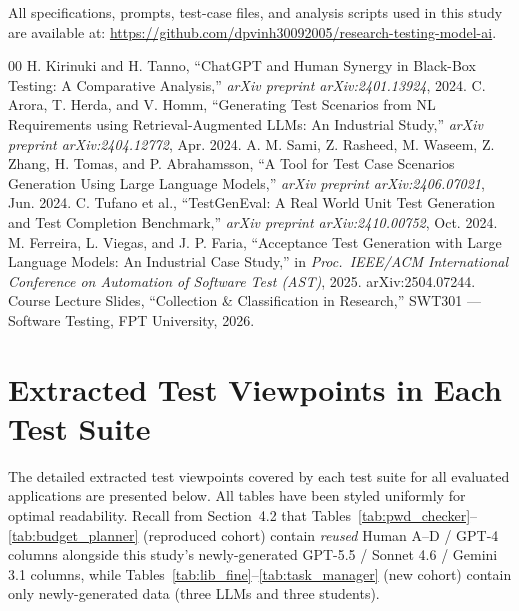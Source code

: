 \documentclass[12pt,a4paper]{article}
\begin{document}
All specifications, prompts, test-case files, and analysis scripts used in this study are available at: \url{https://github.com/dpvinh30092005/research-testing-model-ai}.

\clearpage
\begin{thebibliography}{00}
 H. Kirinuki and H. Tanno, ``ChatGPT and Human Synergy in Black-Box Testing: A Comparative Analysis,'' \textit{arXiv preprint arXiv:2401.13924}, 2024.
 C. Arora, T. Herda, and V. Homm, ``Generating Test Scenarios from NL Requirements using Retrieval-Augmented LLMs: An Industrial Study,'' \textit{arXiv preprint arXiv:2404.12772}, Apr. 2024.
 A. M. Sami, Z. Rasheed, M. Waseem, Z. Zhang, H. Tomas, and P. Abrahamsson, ``A Tool for Test Case Scenarios Generation Using Large Language Models,'' \textit{arXiv preprint arXiv:2406.07021}, Jun. 2024.
 C. Tufano et al., ``TestGenEval: A Real World Unit Test Generation and Test Completion Benchmark,'' \textit{arXiv preprint arXiv:2410.00752}, Oct. 2024.
 M. Ferreira, L. Viegas, and J. P. Faria, ``Acceptance Test Generation with Large Language Models: An Industrial Case Study,'' in \textit{Proc.\ IEEE/ACM International Conference on Automation of Software Test (AST)}, 2025. arXiv:2504.07244.
 Course Lecture Slides, ``Collection \& Classification in Research,'' SWT301 --- Software Testing, FPT University, 2026.
\end{thebibliography}

\clearpage
\appendix
\section{Extracted Test Viewpoints in Each Test Suite}
The detailed extracted test viewpoints covered by each test suite for all evaluated applications are presented below. All tables have been styled uniformly for optimal readability. Recall from Section~4.2 that Tables~\ref{tab:pwd_checker}--\ref{tab:budget_planner} (reproduced cohort) contain \emph{reused} Human A--D / GPT-4 columns alongside this study's newly-generated GPT-5.5 / Sonnet 4.6 / Gemini 3.1 columns, while Tables~\ref{tab:lib_fine}--\ref{tab:task_manager} (new cohort) contain only newly-generated data (three LLMs and three students).
\end{document}
